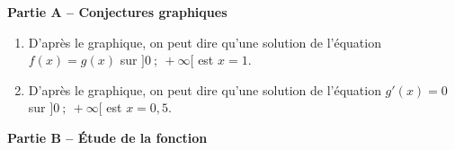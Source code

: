 \documentclass[10pt,a4paper]{article}
\begin{document}
\textbf{Partie A -- Conjectures graphiques}

\medskip


\begin{enumerate}
\item D'après le graphique, on peut dire qu'une solution de l'équation $f(x)=g(x)$ sur $]0~;~+\infty[$ est $x=1$.
\item D'après le graphique, on peut dire qu'une solution de l'équation $g'(x)=0$ sur $]0~;~+\infty[$ est $x=0,5$.
\end{enumerate}

\bigskip

\textbf{Partie B -- Étude de la fonction }

\medskip
\end{document}
